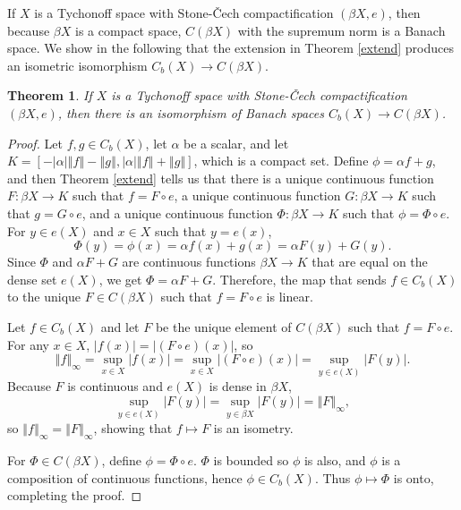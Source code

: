 \documentclass{article}
\newcommand{\norm}[1]{\left\Vert #1 \right\Vert}
\newtheorem{theorem}{Theorem}
\theoremstyle{definition}
\begin{document}
If $X$ is a Tychonoff space with Stone-\v{C}ech compactification $(\beta X,e)$, then
because $\beta X$ is a compact space, $C(\beta X)$ with the supremum norm is a Banach space. 
We show in the following that the extension in Theorem \ref{extend} produces
an isometric isomorphism $C_b(X) \to C(\beta X)$.

\begin{theorem}
If $X$ is a Tychonoff space with Stone-\v{C}ech compactification $(\beta X,e)$, then
there is an isomorphism of Banach spaces $C_b(X) \to C(\beta X)$.
\label{stonecechC}
\end{theorem}
\begin{proof}
Let $f,g \in C_b(X)$, let $\alpha$ be a scalar, and let $K=[-|\alpha| \norm{f}-\norm{g}, |\alpha| \norm{f}+\norm{g}]$, which is a compact set.  Define
$\phi=\alpha f+g$, and then Theorem \ref{extend} tells us that there is a unique continuous function
$F:\beta X \to K$ such that $f = F \circ e$, a unique continuous function 
$G:\beta X \to K$ such that $g = G \circ e$, and a unique continuous function $\Phi:\beta X \to K$ such that
$\phi = \Phi \circ e$. For $y \in e(X)$ and $x \in X$ such that $y=e(x)$,
\[
\Phi(y) = \phi(x) = \alpha f(x)+g(x) = \alpha F(y)+G(y).
\]
Since $\Phi$ and $\alpha F+G$ are continuous functions $\beta X \to K$ that are equal on the dense set $e(X)$,
we get $\Phi=\alpha F+G$. Therefore, the map that sends $f \in C_b(X)$ to the unique $F \in C(\beta X)$ such that
$f = F \circ e$ is linear. 

Let $f \in C_b(X)$ and let $F$ be the unique element of $C(\beta X)$ such that $f = F \circ e$.
For any $x \in X$, $|f(x)| = |(F \circ e)(x)|$, so
\[
\norm{f}_\infty  = \sup_{x \in X} |f(x)| = \sup_{x \in X} |(F \circ e)(x)| = \sup_{y \in e(X)} |F(y)|.
\]
Because $F$ is continuous and $e(X)$ is
dense in $\beta X$,
\[
\sup_{y \in e(X)} |F(y)| = \sup_{y \in \beta X} |F(y)| = \norm{F}_\infty,
\]
so $\norm{f}_\infty = \norm{F}_\infty$, showing that $f \mapsto F$ is an isometry. 

For $\Phi \in C(\beta X)$, define $\phi=\Phi \circ e$. $\Phi$ is bounded so $\phi$ is also, and $\phi$ is a composition of continuous functions,
hence $\phi \in C_b(X)$. Thus $\phi \mapsto \Phi$ is onto, completing the proof.
\end{proof}
\end{document}
